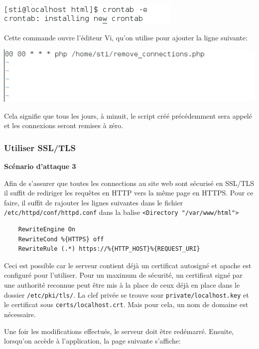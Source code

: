 \documentclass{article}
\begin{document}
\includegraphics[width=\textwidth]{images/tentative_crontab.PNG}

Cette commande ouvre l'éditeur Vi, qu'on utilise pour ajouter la ligne
suivante:

\includegraphics[width=\textwidth]{images/tentative_crontab_detail.PNG}

Cela signifie que tous les jours, à minuit, le script créé précédemment
sera appelé et les connexions seront remises à zéro.

\subsubsection{Utiliser SSL/TLS}

\textbf{Scénario d'attaque 3}

Afin de s'assurer que toutes les connections au site web sont sécurisé
en SSL/TLS il suffit de rediriger les requêtes en HTTP vers la même page
en HTTPS. Pour ce faire, il suffit de rajouter les lignes suivantes dans
le fichier \texttt{/etc/httpd/conf/httpd.conf} dans la balise
\texttt{\textless{}Directory\ "/var/www/html"\textgreater{}}

\begin{verbatim}
    RewriteEngine On
    RewriteCond %{HTTPS} off
    RewriteRule (.*) https://%{HTTP_HOST}%{REQUEST_URI}
\end{verbatim}

Ceci est possible car le serveur contient déjà un certificat autosigné
et apache est configuré pour l'utiliser. Pour un maximum de sécurité, un
certificat signé par une authorité reconnue peut être mis à la place de
ceux déjà en place dans le dossier \texttt{/etc/pki/tls/}. La clef
privée se trouve sour \texttt{private/localhost.key} et le certificat
sous \texttt{certs/localhost.crt}. Mais pour cela, un nom de domaine est
nécessaire.

Une foir les modifications effectués, le serveur doit être redémarré.
Ensuite, lorsqu'on accède à l'application, la page suivante s'affiche:
\end{document}
